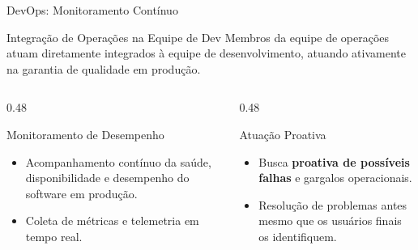 \documentclass[aspectratio=169, 9pt]{beamer}
\begin{document}
\begin{frame}{DevOps: Monitoramento Contínuo}
  \begin{block}{Integração de Operações na Equipe de Dev}
    Membros da equipe de operações atuam diretamente integrados à equipe de desenvolvimento, atuando ativamente na garantia de qualidade em produção.
  \end{block}

  \vspace{0.3cm}

  \begin{columns}[T]
    \begin{column}{0.48\textwidth}
      \begin{exampleblock}{Monitoramento de Desempenho}
        \begin{itemize}
          \item Acompanhamento contínuo da saúde, disponibilidade e desempenho do software em produção.
          \item Coleta de métricas e telemetria em tempo real.
        \end{itemize}
      \end{exampleblock}
    \end{column}

    \begin{column}{0.48\textwidth}
      \begin{alertblock}{Atuação Proativa}
        \begin{itemize}
          \item Busca \textbf{proativa de possíveis falhas} e gargalos operacionais.
          \item Resolução de problemas antes mesmo que os usuários finais os identifiquem.
        \end{itemize}
      \end{alertblock}
    \end{column}
  \end{columns}
\end{frame}
\end{document}
